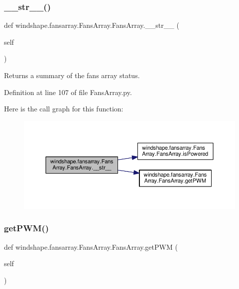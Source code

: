 \subsubsection{\texorpdfstring{\+\_\+\+\_\+str\+\_\+\+\_\+()}{\_\_str\_\_()}}
{\footnotesize\ttfamily def windshape.\+fansarray.\+Fans\+Array.\+Fans\+Array.\+\_\+\+\_\+str\+\_\+\+\_\+ (\begin{DoxyParamCaption}\item[{}]{self }\end{DoxyParamCaption})}

\begin{DoxyVerb}Returns a summary of the fans array status.\end{DoxyVerb}
 

Definition at line 107 of file Fans\+Array.\+py.

Here is the call graph for this function\+:\nopagebreak
\begin{figure}[H]
\begin{center}
\leavevmode
\includegraphics[width=350pt]{classwindshape_1_1fansarray_1_1_fans_array_1_1_fans_array_aceaf476d88639804e38c4af301acfec1_cgraph}
\end{center}
\end{figure}
\mbox{\label{classwindshape_1_1fansarray_1_1_fans_array_1_1_fans_array_a56e88cf7d3e1c3804ad8f22bae65ac45}} 
\subsubsection{\texorpdfstring{get\+P\+W\+M()}{getPWM()}}
{\footnotesize\ttfamily def windshape.\+fansarray.\+Fans\+Array.\+Fans\+Array.\+get\+P\+WM (\begin{DoxyParamCaption}\item[{}]{self }\end{DoxyParamCaption})}

